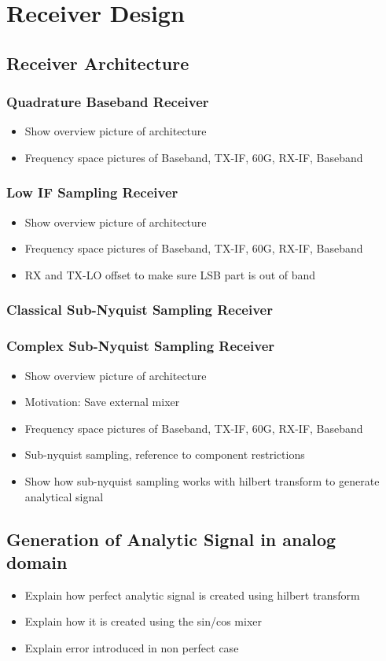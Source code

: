 \chapter{Receiver Design}
\section{Receiver Architecture}
\subsection{Quadrature Baseband Receiver}
\begin{itemize}
\item Show overview picture of architecture
\item Frequency space pictures of Baseband, TX-IF, 60G, RX-IF, Baseband
\end{itemize}

\subsection{Low IF Sampling Receiver}
\begin{itemize}
\item Show overview picture of architecture
\item Frequency space pictures of Baseband, TX-IF, 60G, RX-IF, Baseband
\item RX and TX-LO offset to make sure LSB part is out of band
\end{itemize}

\subsection{Classical Sub-Nyquist Sampling Receiver}
\subsection{Complex Sub-Nyquist Sampling Receiver}
\begin{itemize}
\item Show overview picture of architecture
\item Motivation: Save external mixer
\item Frequency space pictures of Baseband, TX-IF, 60G, RX-IF, Baseband
\item Sub-nyquist sampling, reference to component restrictions
\item Show how sub-nyquist sampling works with hilbert transform to generate analytical signal
\end{itemize}

\section{Generation of Analytic Signal in analog domain}
\begin{itemize}
\item Explain how perfect analytic signal is created using hilbert transform
\item Explain how it is created using the sin/cos mixer
\item Explain error introduced in non perfect case
\end{itemize}

